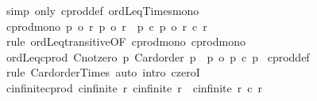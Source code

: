 \begin{isabellebody}
%
\isadelimproof
%
\endisadelimproof
%
\isatagproof
{}\isamarkupfalse%
\ {\isacharparenleft}{\kern0pt}simp\ only{\isacharcolon}{\kern0pt}\ cprod{\isacharunderscore}{\kern0pt}def\ ordLeq{\isacharunderscore}{\kern0pt}Times{\isacharunderscore}{\kern0pt}mono{}{\isacharparenright}{\kern0pt}%
\endisatagproof
{\isafoldproof}%
%
\isadelimproof
\isanewline
%
\endisadelimproof
\isanewline
{}\isamarkupfalse%
\ cprod{\isacharunderscore}{\kern0pt}mono{\isacharcolon}{\kern0pt}\ {\isachardoublequoteopen}{\isasymlbrakk}p{}\ {\isasymle}o\ r{}{\isacharsemicolon}{\kern0pt}\ p{}\ {\isasymle}o\ r{}{\isasymrbrakk}\ {\isasymLongrightarrow}\ p{}\ {\isacharasterisk}{\kern0pt}c\ p{}\ {\isasymle}o\ r{}\ {\isacharasterisk}{\kern0pt}c\ r{}{\isachardoublequoteclose}\isanewline
%
\isadelimproof
%
\endisadelimproof
%
\isatagproof
{}\isamarkupfalse%
\ {\isacharparenleft}{\kern0pt}rule\ ordLeq{\isacharunderscore}{\kern0pt}transitive{\isacharbrackleft}{\kern0pt}OF\ cprod{\isacharunderscore}{\kern0pt}mono{}\ cprod{\isacharunderscore}{\kern0pt}mono{}{\isacharbrackright}{\kern0pt}{\isacharparenright}{\kern0pt}%
\endisatagproof
{\isafoldproof}%
%
\isadelimproof
\isanewline
%
\endisadelimproof
\isanewline
{}\isamarkupfalse%
\ ordLeq{\isacharunderscore}{\kern0pt}cprod{}{\isacharcolon}{\kern0pt}\ {\isachardoublequoteopen}{\isasymlbrakk}Cnotzero\ p{}{\isacharsemicolon}{\kern0pt}\ Card{\isacharunderscore}{\kern0pt}order\ p{}{\isasymrbrakk}\ {\isasymLongrightarrow}\ p{}\ {\isasymle}o\ p{}\ {\isacharasterisk}{\kern0pt}c\ p{}{\isachardoublequoteclose}\isanewline
%
\isadelimproof
%
\endisadelimproof
%
\isatagproof
{}\isamarkupfalse%
\ cprod{\isacharunderscore}{\kern0pt}def\ \isamarkupfalse%
\ {\isacharparenleft}{\kern0pt}rule\ Card{\isacharunderscore}{\kern0pt}order{\isacharunderscore}{\kern0pt}Times{}{\isacharparenright}{\kern0pt}\ {\isacharparenleft}{\kern0pt}auto\ intro{\isacharcolon}{\kern0pt}\ czeroI{\isacharparenright}{\kern0pt}%
\endisatagproof
{\isafoldproof}%
%
\isadelimproof
\isanewline
%
\endisadelimproof
\isanewline
{}\isamarkupfalse%
\ cinfinite{\isacharunderscore}{\kern0pt}cprod{\isacharcolon}{\kern0pt}\ {\isachardoublequoteopen}{\isasymlbrakk}cinfinite\ r{}{\isacharsemicolon}{\kern0pt}\ cinfinite\ r{}{\isasymrbrakk}\ {\isasymLongrightarrow}\ cinfinite\ {\isacharparenleft}{\kern0pt}r{}\ {\isacharasterisk}{\kern0pt}c\ r{}{\isacharparenright}{\kern0pt}{\isachardoublequoteclose}\isanewline

\end{isabellebody}
